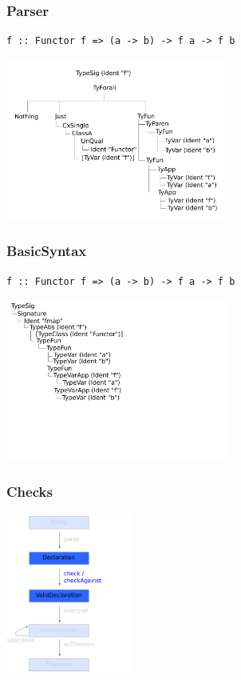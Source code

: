 \documentclass{beamer}
\begin{document}
\begin{frame}[fragile]
\frametitle{Parser}
\begin{verbatim}
f :: Functor f => (a -> b) -> f a -> f b
\end{verbatim}

\pause

\begin{center}
\includegraphics[height=200px]{ast-orig}
\end{center}
\end{frame}


\begin{frame}[fragile]
\frametitle{BasicSyntax}
\begin{verbatim}
f :: Functor f => (a -> b) -> f a -> f b
\end{verbatim}

\begin{center}
\includegraphics[height=200px]{ast-simple}
\end{center}
\end{frame}


\begin{frame}
\frametitle{Checks}
\begin{center}
\includegraphics[height=200px]{overview-free-theorems-check}
\end{center}
\end{frame}
\end{document}
